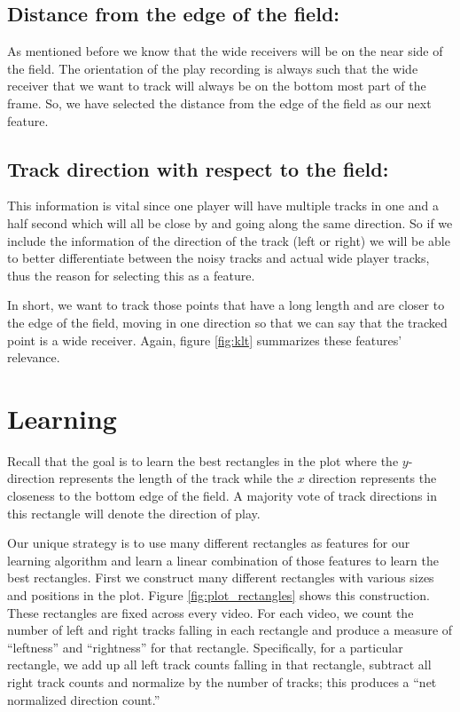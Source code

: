 \documentclass{article} %
\begin{document}
\subsection*{Distance from the edge of the field:}

As mentioned before we know that the wide receivers will be on the near side of the field. The orientation of the play recording is always such that the wide receiver that we want to track will always be on the bottom most part of the frame. So, we have selected the distance from the edge of the field as our next feature. 
	
\subsection*{Track direction with respect to the field:}

This information is vital since one player will have multiple tracks in one and a half second which will all be close by and going along the same direction. So if we include the information of the direction of the track (left or right) we will be able to better differentiate between the noisy tracks and actual wide player tracks, thus the reason for selecting this as a feature.

In short, we want to track those points that have a long length and are closer to the edge of the field, moving in one direction so that we can say that the tracked point is a wide receiver. Again, figure \ref{fig:klt} summarizes these features' relevance.

\section{Learning}

Recall that the goal is to learn the best rectangles in the plot where the $y$-direction represents the length of the track while the $x$ direction represents the closeness to the bottom edge of the field. A majority vote of track directions in this rectangle will denote the direction of play.

Our unique strategy is to use many different rectangles as features for our learning algorithm and learn a linear combination of those features to learn the best rectangles. First we construct many different rectangles with various sizes and positions in the plot. Figure \ref{fig:plot_rectangles} shows this construction. These rectangles are fixed across every video. For each video, we count the number of left and right tracks falling in each rectangle and produce a measure of ``leftness'' and ``rightness'' for that rectangle. Specifically, for a particular rectangle, we add up all left track counts falling in that rectangle, subtract all right track counts and normalize by the number of tracks; this produces a ``net normalized direction count.''
\end{document}

